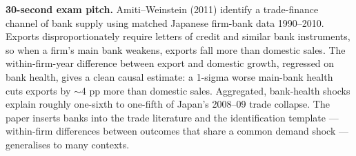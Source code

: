 \documentclass[11pt]{article}
\begin{document}
\begin{keybox}
\textbf{30-second exam pitch.} Amiti--Weinstein (2011) identify a trade-finance channel of bank supply using matched Japanese firm-bank data 1990--2010. Exports disproportionately require letters of credit and similar bank instruments, so when a firm's main bank weakens, exports fall more than domestic sales. The within-firm-year difference between export and domestic growth, regressed on bank health, gives a clean causal estimate: a 1-sigma worse main-bank health cuts exports by $\sim$4 pp more than domestic sales. Aggregated, bank-health shocks explain roughly one-sixth to one-fifth of Japan's 2008--09 trade collapse. The paper inserts banks into the trade literature and the identification template --- within-firm differences between outcomes that share a common demand shock --- generalises to many contexts.
\end{keybox}
\end{document}
